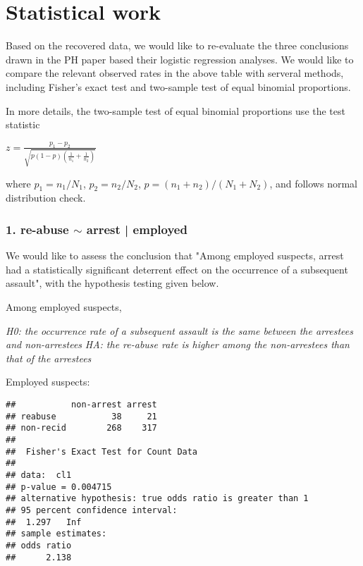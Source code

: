\documentclass{article}\usepackage{graphicx, color}
\makeatletter
\newenvironment{kframe}{%
 \def\at@end@of@kframe{}%
 \ifinner\ifhmode%
  \def\at@end@of@kframe{\end{minipage}}%
  \begin{minipage}{\columnwidth}%
 \fi\fi%
 \def\FrameCommand##1{\hskip\@totalleftmargin \hskip-\fboxsep
 \colorbox{shadecolor}{##1}\hskip-\fboxsep
     \hskip-\linewidth \hskip-\@totalleftmargin \hskip\columnwidth}%
 \MakeFramed {\advance\hsize-\width
   \@totalleftmargin\z@ \linewidth\hsize
   \@setminipage}}%
 {\par\unskip\endMakeFramed%
 \at@end@of@kframe}
\newenvironment{knitrout}{}{} %
\makeatother
\begin{document}
\section*{Statistical work}
\hspace{12 pt} Based on the recovered data, we would like to
re-evaluate the three conclusions drawn in the PH paper based their
logistic regression analyses. We would like to compare the relevant
observed rates in the above table with serveral methods, including
Fisher's exact test and two-sample test of equal binomial proportions.


In more details, the two-sample test of equal binomial proportions use
the test statistic
\begin{center}
$\displaystyle z=\frac{p_1 - p_2}{\sqrt{p(1-p)(\frac{1}{n_1}+\frac{1}{n_2})}}$
\end{center}
where $p_1=n_1/N_1$, $p_2=n_2/N_2$, $p=(n_1+n_2)/(N_1+N_2)$, and
follows normal distribution check.\newline




\subsubsection*{1. re-abuse $\sim$ arrest | employed}
\hspace{12 pt} We would like to assess the conclusion that "Among
employed suspects, arrest had a statistically significant deterrent
effect on the occurrence of a subsequent assault", with the hypothesis
testing given below.


Among employed suspects,


\hspace{12 pt} \textit{H0: the occurrence rate of a subsequent assault
  is the same between the arrestees and non-arrestees} \newline
\vspace{2 pt}
\hspace{24 pt} \textit{HA: the re-abuse rate is higher among the
  non-arrestees than that of the arrestees} \newline


Employed suspects:

\begin{knitrout}
\color{fgcolor}\begin{kframe}
\begin{verbatim}
##           non-arrest arrest
## reabuse           38     21
## non-recid        268    317
## 
## 	Fisher's Exact Test for Count Data
## 
## data:  cl1 
## p-value = 0.004715
## alternative hypothesis: true odds ratio is greater than 1 
## 95 percent confidence interval:
##  1.297   Inf 
## sample estimates:
## odds ratio 
##      2.138
\end{verbatim}
\end{kframe}
\end{knitrout}
\end{document}
